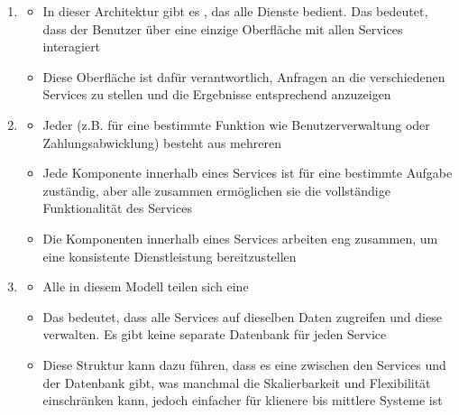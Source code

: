 \begin{infoBox}[title=Haupttopologie des Service-Based-Stils]
    \begin{enumerate}
        \item {}
        \begin{itemize}
            \item In dieser Architektur gibt es , das alle Dienste bedient. Das bedeutet, dass der Benutzer über eine einzige Oberfläche mit allen Services interagiert
            \item Diese Oberfläche ist dafür verantwortlich, Anfragen an die verschiedenen Services zu stellen und die Ergebnisse entsprechend anzuzeigen
        \end{itemize}
        \item {}
        \begin{itemize}
            \item Jeder  (z.B. für eine bestimmte Funktion wie Benutzerverwaltung oder Zahlungsabwicklung) besteht aus mehreren 
            \item Jede Komponente innerhalb eines Services ist für eine bestimmte Aufgabe zuständig, aber alle zusammen ermöglichen sie die vollständige Funktionalität des Services
            \item Die Komponenten innerhalb eines Services arbeiten eng zusammen, um eine konsistente Dienstleistung bereitzustellen
        \end{itemize}
        \item {}
        \begin{itemize}
            \item Alle  in diesem Modell teilen sich eine 
            \item Das bedeutet, dass alle Services auf dieselben Daten zugreifen und diese verwalten. Es gibt keine separate Datenbank für jeden Service
            \item Diese Struktur kann dazu führen, dass es eine  zwischen den Services und der Datenbank gibt, was manchmal die Skalierbarkeit und Flexibilität einschränken kann, jedoch einfacher für klienere bis mittlere Systeme ist
        \end{itemize}
    \end{enumerate}
\end{infoBox}

